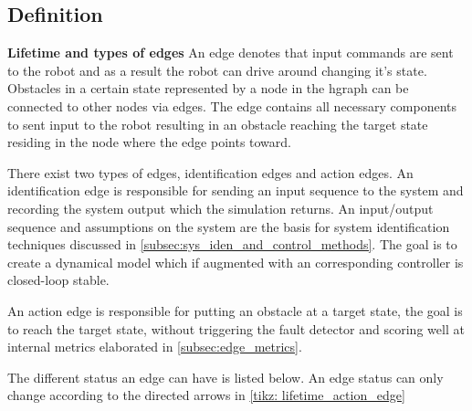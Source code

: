 \subsection{Definition}
\label{subsec:hgraph_definition}









\textbf{Lifetime and types of edges}
\newline
An edge denotes that input commands are sent to the robot and as a result the robot can drive around changing it's state. Obstacles in a certain state represented by a node in the hgraph can be connected to other nodes via edges.
The edge contains all necessary components to sent input to the robot resulting in an obstacle reaching the target state residing in the node where the edge points toward. \vspace{\baselineskip}

There exist two types of edges, identification edges and action edges. An identification edge is responsible for sending an input sequence to the system and recording the system output which the simulation returns. An input/output sequence and assumptions on the system are the basis for system identification techniques discussed in \cref{subsec:sys_iden_and_control_methods}. The goal is to create a dynamical model which if augmented with an corresponding controller is closed-loop stable. \vspace{\baselineskip}

An action edge is responsible for putting an obstacle at a target state, the goal is to reach the target state, without triggering the fault detector and scoring well at internal metrics elaborated in \cref{subsec:edge_metrics}.


The different status an edge can have is listed below. An edge status can only change according to the directed arrows in \cref{tikz: lifetime_action_edge}


